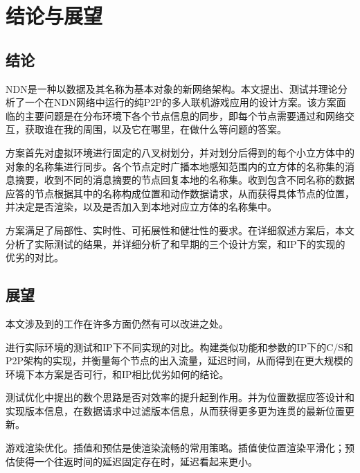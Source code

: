 % 
%
%
% 
%
\chapter{结论与展望}
\label{ConclusionChapter}
\section{结论}
\par
NDN是一种以数据及其名称为基本对象的新网络架构。本文提出、测试并理论分析了一个在NDN网络中运行的纯P2P的多人联机游戏应用的设计方案。该方案面临的主要问题是在分布环境下各个节点信息的同步，即每个节点需要通过和网络交互，获取谁在我的周围，以及它在哪里，在做什么等问题的答案。
\par
方案首先对虚拟环境进行固定的八叉树划分，并对划分后得到的每个小立方体中的对象的名称集进行同步。各个节点定时广播本地感知范围内的立方体的名称集的消息摘要，收到不同的消息摘要的节点回复本地的名称集。收到包含不同名称的数据应答的节点根据其中的名称构成位置和动作数据请求，从而获得具体节点的位置，并决定是否渲染，以及是否加入到本地对应立方体的名称集中。
\par
方案满足了局部性、实时性、可拓展性和健壮性的要求。在详细叙述方案后，本文分析了实际测试的结果，并详细分析了和早期的三个设计方案，和IP下的实现的优劣的对比。
\section{展望}
\par
本文涉及到的工作在许多方面仍然有可以改进之处。
\par
进行实际环境的测试和IP下不同实现的对比。构建类似功能和参数的IP下的C/S和P2P架构的实现，并衡量每个节点的出入流量，延迟时间，从而得到在更大规模的环境下本方案是否可行，和IP相比优劣如何的结论。
\par
测试优化中提出的数个思路是否对效率的提升起到作用。并为位置数据应答设计和实现版本信息，在数据请求中过滤版本信息，从而获得更多更为连贯的最新位置更新。
\par
游戏渲染优化。插值和预估是使渲染流畅的常用策略。插值使位置渲染平滑化；预估使得一个往返时间的延迟固定存在时，延迟看起来更小。

